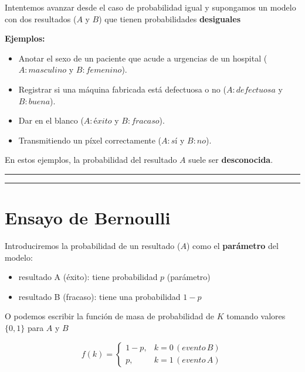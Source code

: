 \documentclass[
]{book}
\providecommand{\tightlist}{%
  \setlength{\itemsep}{0pt}\setlength{\parskip}{0pt}}
\begin{document}
Intentemos avanzar desde el caso de probabilidad igual y supongamos un modelo con dos resultados (\(A\) y \(B\)) que tienen probabilidades \textbf{desiguales}

\textbf{Ejemplos:}

\begin{itemize}
\item
  Anotar el sexo de un paciente que acude a urgencias de un hospital (\(A:masculino\) y \(B:femenino\)).
\item
  Registrar si una máquina fabricada está defectuosa o no (\(A:defectuosa\) y \(B:buena\)).
\item
  Dar en el blanco (\(A:éxito\) y \(B:fracaso\)).
\item
  Transmitiendo un píxel correctamente (\(A:sí\) y \(B:no\)).
\end{itemize}

En estos ejemplos, la probabilidad del resultado \(A\) suele ser \textbf{desconocida}.

\begin{center}\rule{0.5\linewidth}{0.5pt}\end{center}

\begin{center}\rule{0.5\linewidth}{0.5pt}\end{center}

\hypertarget{ensayo-de-bernoulli-1}{%
\section{Ensayo de Bernoulli}\label{ensayo-de-bernoulli-1}}

Introduciremos la probabilidad de un resultado (\(A\)) como el \textbf{parámetro} del modelo:

\begin{itemize}
\tightlist
\item
  resultado A (éxito): tiene probabilidad \(p\) (parámetro)
\item
  resultado B (fracaso): tiene una probabilidad \(1-p\)
\end{itemize}

O podemos escribir la función de masa de probabilidad de \(K\) tomando valores \(\{0, 1\}\) para \(A\) y \(B\)

\[
    f(k)= 
\begin{cases}
    1-p,&  k=0\, (evento\, B)\\
    p,& k=1\, (evento\, A) 
\end{cases}
\]
\end{document}
